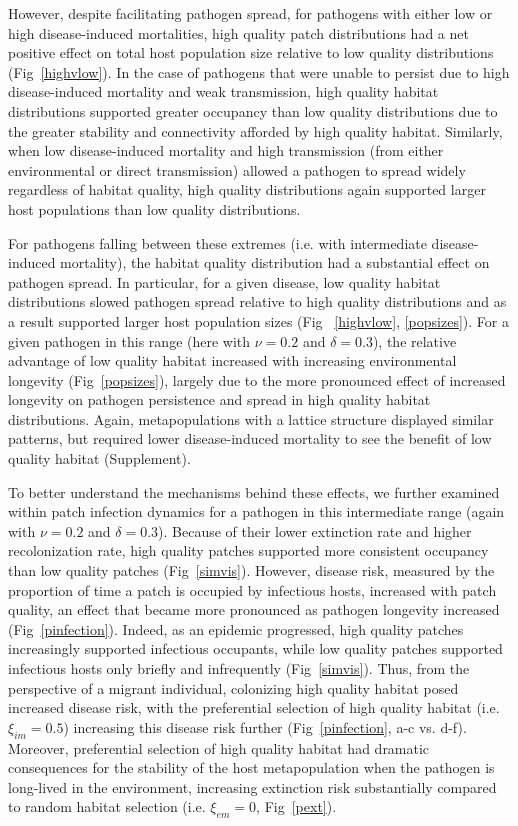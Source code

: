 \documentclass{article}
\begin{document}
However, despite facilitating pathogen spread, for pathogens with either low or high disease-induced mortalities, high quality patch distributions had a net positive effect on total host population size relative to low quality distributions (Fig~\ref{highvlow}).  
In the case of pathogens that were unable to persist due to high disease-induced mortality and weak transmission, high quality habitat distributions supported greater occupancy than low quality distributions due to the greater stability and connectivity afforded by high quality habitat.
Similarly, when low disease-induced mortality and high transmission (from either environmental or direct transmission) allowed a pathogen to spread widely regardless of habitat quality, high quality distributions again supported larger host populations than low quality distributions.

For pathogens falling between these extremes (i.e. with intermediate disease-induced mortality), the habitat quality distribution had a substantial effect on pathogen spread.  
In particular, for a given disease, low quality habitat distributions slowed pathogen spread relative to high quality distributions and as a result supported larger host population sizes (Fig ~\ref{highvlow}, \ref{popsizes}).  
For a given pathogen in this range (here with $\nu = 0.2$ and $\delta = 0.3$), the relative advantage of low quality habitat increased with increasing environmental longevity (Fig~\ref{popsizes}), largely due to the more pronounced effect of increased longevity on pathogen persistence and spread in high quality habitat distributions.
Again, metapopulations with a lattice structure displayed similar patterns, but required lower disease-induced mortality to see the benefit of low quality habitat (Supplement).

To better understand the mechanisms behind these effects, we further examined within patch infection dynamics for a pathogen in this intermediate range (again with $\nu = 0.2$ and $\delta = 0.3$).  
Because of their lower extinction rate and higher recolonization rate, high quality patches supported more consistent occupancy than low quality patches (Fig~\ref{simvis}).  
However, disease risk, measured by the proportion of time a patch is occupied by infectious hosts, increased with patch quality, an effect that became more pronounced as pathogen longevity increased (Fig~\ref{pinfection}).
Indeed, as an epidemic progressed, high quality patches increasingly supported infectious occupants, while low quality patches supported infectious hosts only briefly and infrequently (Fig~\ref{simvis}).  
Thus, from the perspective of a migrant individual, colonizing high quality habitat posed increased disease risk, with the preferential selection of high quality habitat (i.e. $\xi_{im} = 0.5$) increasing this disease risk further (Fig~\ref{pinfection}, a-c vs. d-f).
Moreover, preferential selection of high quality habitat had dramatic consequences for the stability of the host metapopulation when the pathogen is long-lived in the environment, increasing extinction risk substantially compared to random habitat selection (i.e. $\xi_{em} = 0$, Fig~\ref{pext}).
\end{document}

